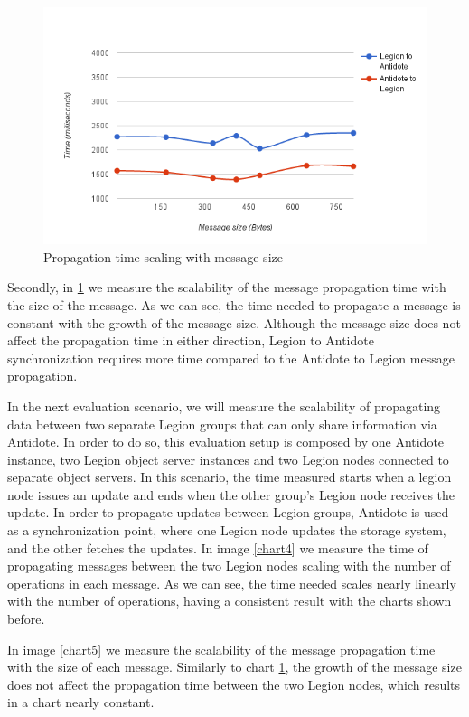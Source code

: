 \begin{figure}[h]
\centering
\includegraphics[scale=0.7]{files/chart2.png}
\caption{Propagation time scaling with message size}
\label{chart2}
\end{figure}

Secondly, in \ref{chart2} we  measure the scalability of the message propagation time with the size of the message. As we can see, the time needed to propagate a message is constant with the growth of the message size. Although the message size does not affect the propagation time in either direction, Legion to Antidote synchronization requires more time compared to the Antidote to Legion message propagation.\par
	In the next evaluation scenario, we will measure the scalability of propagating data between two separate Legion groups that can only share information via Antidote. In order to do so, this evaluation setup is composed by one Antidote instance, two Legion object server instances and two Legion nodes connected to separate object servers. In this scenario, the time measured starts when a legion node issues an update and ends when the other group's Legion node receives the update. In order to propagate updates between Legion groups, Antidote is used as a synchronization point, where one Legion node updates the storage system, and the other fetches the updates. In image \ref{chart4} we measure the time of propagating messages between the two Legion nodes scaling with the number of operations in each message. As we can see, the time needed scales nearly linearly with the number of operations, having a consistent result with the charts shown before.\par
	In image \ref{chart5} we measure the scalability of the message propagation time with the size of each message. Similarly to chart \ref{chart2}, the growth of the message size does not affect the propagation time between the two Legion nodes, which results in a chart nearly constant.

